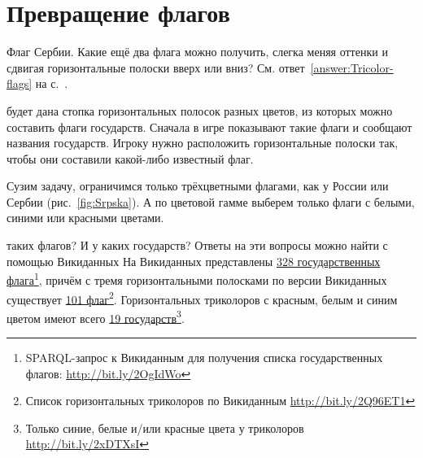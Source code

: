\chapter{Превращение флагов}
\label{ch:draughts-moves}

\begin{marginfigure}[-2em]
{%
\setlength{\fboxsep}{0pt}%
\setlength{\fboxrule}{1pt}%
%
}%

\caption{Флаг Сербии. Какие ещё два флага можно получить, слегка меняя оттенки 
    и сдвигая горизонтальные полоски вверх или вниз? 
    См. ответ~\ref{answer:Tricolor-flags} на с.~\pageref{answer:Tricolor-flags}.}
\label{fig:Srpska}
\end{marginfigure}

 будет дана стопка горизонтальных полосок разных цветов, 
из которых можно составить флаги государств. Сначала в игре показывают такие флаги и сообщают названия государств.
Игроку нужно расположить горизонтальные полоски так, чтобы они составили какой-либо известный флаг. 

Сузим задачу, ограничимся только трёхцветными флагами, как у России 
или Сербии (рис.~\ref{fig:Srpska}).
А по цветовой гамме выберем только флаги с белыми, синими или красными цветами.

 таких флагов? И у каких государств? Ответы на эти вопросы 
можно найти с помощью Викиданных %
На Викиданных представлены \href{http://bit.ly/2OgIdWo}{328 государственных флага}\footnote[][-3cm]{
    SPARQL-запрос к Викиданным для получения списка государственных флагов: \url{http://bit.ly/2OgIdWo}
}, 
причём с тремя горизонтальными полосками по версии Викиданных 
существует \href{http://bit.ly/2Q96ET1}{101 флаг}\footnote[][-2.8cm]{
    Список горизонтальных триколоров по Викиданным
    \url{http://bit.ly/2Q96ET1}
}. 
Горизонтальных триколоров с красным, белым и синим цветом 
имеют всего \href{http://bit.ly/2xDTXsI}{19 государств}\footnote[][-2.0cm]{
    Только синие, белые и/или красные цвета у триколоров 
    \url{http://bit.ly/2xDTXsI}
    \bigskip 
}.


